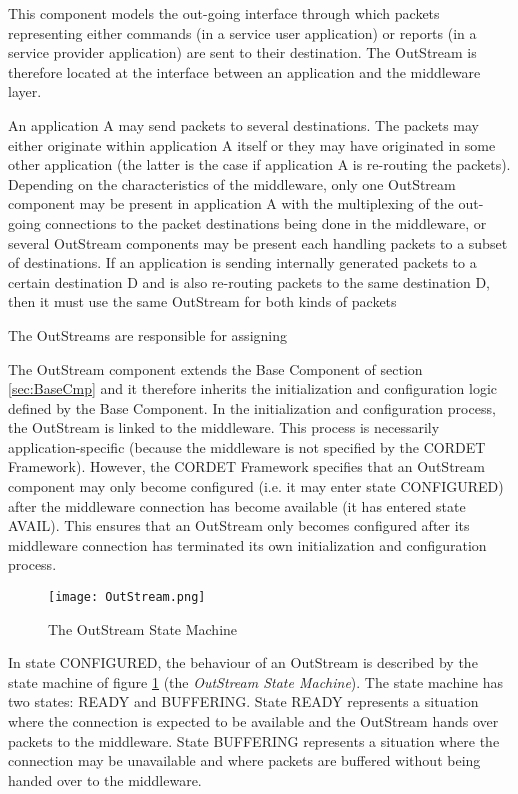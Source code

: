 This component models the out-going interface through which packets representing either commands (in a service user application) or reports (in a service provider application) are sent to their destination. The OutStream is therefore located at the interface between an application and the middleware layer. 

An application A may send packets to several destinations. The packets may either originate within application A itself or they may have originated in some other application (the latter is the case if application A is re-routing the packets). Depending on the characteristics of the middleware, only one OutStream component may be present in application A with the multiplexing of the out-going connections to the packet destinations being done in the middleware, or several OutStream components may be present each handling packets to a subset of destinations. If an application is sending internally generated packets to a certain destination D and is also re-routing packets to the same destination D, then it must use the same OutStream for both kinds of packets 

The OutStreams are responsible for assigning 

The OutStream component extends the Base Component of section \ref{sec:BaseCmp} and it therefore inherits the initialization and configuration logic defined by the Base Component. In the initialization and configuration process, the OutStream is linked to the middleware. This process is necessarily application-specific (because the middleware is not specified by the CORDET Framework). However, the CORDET Framework specifies that an OutStream component may only become configured (i.e. it may enter state CONFIGURED) after the middleware connection has become available (it has entered state AVAIL). This ensures that an OutStream only becomes configured after its middleware connection has terminated its own initialization and configuration process.

\begin{figure}[ht]
 \centering
 \texttt{[image: OutStream.png]}
 \caption{The OutStream State Machine}
 \label{fig:OutStream}
\end{figure}

In state CONFIGURED, the behaviour of an OutStream is described by the state machine of figure \ref{fig:OutStream} (the \textit{OutStream State Machine}). The state machine has two states: READY and BUFFERING. State READY represents a situation where the connection is expected to be available and the OutStream hands over packets to the middleware. State BUFFERING represents a situation where the connection may be unavailable and where packets are buffered without being handed over to the middleware.

